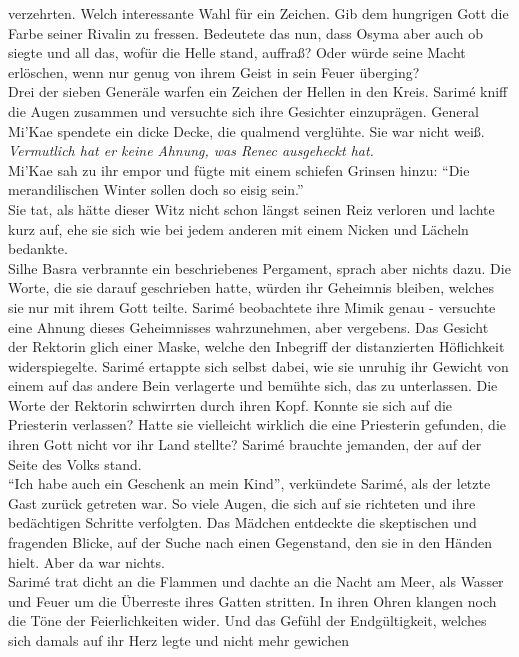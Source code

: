 verzehrten. Welch interessante Wahl für ein Zeichen. Gib dem hungrigen Gott die Farbe seiner Rivalin 
zu fressen. Bedeutete das nun, dass Osyma aber auch ob siegte und all das, wofür die Helle stand, 
auffraß? Oder würde seine Macht erlöschen, wenn nur genug von ihrem Geist in sein Feuer überging?\\
Drei der sieben Generäle warfen ein Zeichen der Hellen in den Kreis. Sarimé kniff die Augen 
zusammen und versuchte sich ihre Gesichter einzuprägen. General Mi'Kae spendete ein dicke Decke, 
die qualmend verglühte. Sie war nicht weiß. \textit{Vermutlich hat er keine Ahnung, was Renec 
ausgeheckt hat.}\\
Mi'Kae sah zu ihr empor und fügte mit einem schiefen Grinsen hinzu: ``Die merandilischen Winter 
sollen doch so eisig sein.''\\
Sie tat, als hätte dieser Witz nicht schon längst seinen Reiz verloren und lachte kurz auf, ehe sie 
sich wie bei jedem anderen mit einem Nicken und Lächeln bedankte.\\
Silhe Basra verbrannte ein beschriebenes Pergament, sprach aber nichts dazu. Die Worte, die sie 
darauf geschrieben hatte, würden ihr Geheimnis bleiben, welches sie nur mit ihrem Gott teilte. 
Sarimé beobachtete ihre Mimik genau - versuchte eine Ahnung dieses Geheimnisses wahrzunehmen, aber 
vergebens. Das Gesicht der Rektorin glich einer Maske, welche den Inbegriff der distanzierten 
Höflichkeit widerspiegelte. Sarimé ertappte sich selbst dabei, wie sie unruhig ihr Gewicht von 
einem auf das andere Bein verlagerte und bemühte sich, das zu unterlassen. Die Worte der Rektorin 
schwirrten durch ihren Kopf. Konnte sie sich auf die Priesterin verlassen? Hatte sie vielleicht 
wirklich die eine Priesterin gefunden, die ihren Gott nicht vor ihr Land stellte? Sarimé brauchte 
jemanden, der auf der Seite des Volks stand.\\
``Ich habe auch ein Geschenk an mein Kind'', verkündete Sarimé, als der letzte Gast zurück getreten 
war. So viele Augen, die sich auf sie richteten und ihre bedächtigen Schritte verfolgten. Das 
Mädchen entdeckte die skeptischen und fragenden Blicke, auf der Suche nach einen Gegenstand, den 
sie in den Händen hielt. Aber da war nichts.\\
Sarimé trat dicht an die Flammen und dachte an die Nacht am Meer, als Wasser und Feuer um die 
Überreste ihres Gatten stritten. In ihren Ohren klangen noch die Töne der Feierlichkeiten wider. 
Und das Gefühl der Endgültigkeit, welches sich damals auf ihr Herz legte und nicht mehr gewichen 
